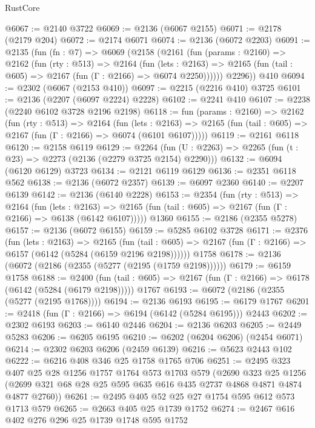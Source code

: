 \begin{lexlean}{RustCore}
\begin{coremodule}
@6067 := @2140 @3722
@6069 := @2136 (@6067 @2155)
@6071 := @2178 (@2179 @204)
@6072 := @2174 @6071
@6074 := @2136 (@6072 @2203)
@6091 := @2135
    (fun (fn : @7) =>
    @6069
      (@2158
        (@2161
          (fun (params : @2160) =>
          @2162
            (fun (rty : @513) =>
            @2164
              (fun (lets : @2163) =>
              @2165 (fun (tail : @605) => @2167 (fun (Γ : @2166) => @6074 @2250))))))
        @2296))
    @410
@6094 := @2302 (@6067 (@2153 @410))
@6097 := @2215 (@2216 @410) @3725
@6101 := @2136 (@2207 (@6097 @2224) @2228)
@6102 := @2241 @410
@6107 := @2238 (@2240 @6102 @3728 @2196 @2198)
@6118 := fun (params : @2160) =>
  @2162
    (fun (rty : @513) =>
    @2164
      (fun (lets : @2163) =>
      @2165 (fun (tail : @605) => @2167 (fun (Γ : @2166) => @6074 (@6101 @6107)))))
@6119 := @2161 @6118
@6120 := @2158 @6119
@6129 := @2264 (fun (U : @2263) => @2265 (fun (t : @23) => @2273 (@2136 (@2279 @3725 @2154) @2290)))
@6132 := @6094 (@6120 @6129) @3723
@6134 := @2121 @6119 @6129
@6136 := @2351 @6118 @562
@6138 := @2136 (@6072 @2357)
@6139 := @6097 @2360
@6140 := @2207 @6139
@6142 := @2136 (@6140 @2228)
@6153 := @2354
    (fun (rty : @513) =>
    @2164
      (fun (lets : @2163) =>
      @2165 (fun (tail : @605) => @2167 (fun (Γ : @2166) => @6138 (@6142 @6107)))))
    @1360
@6155 := @2186 (@2355 @5278)
@6157 := @2136 (@6072 @6155)
@6159 := @5285 @6102 @3728
@6171 := @2376
    (fun (lets : @2163) =>
    @2165
      (fun (tail : @605) => @2167 (fun (Γ : @2166) => @6157 (@6142 (@5284 (@6159 @2196 @2198))))))
    @1758
@6178 := @2136 (@6072 (@2186 (@2355 (@5277 (@2195 (@1759 @2198))))))
@6179 := @6159 @1758
@6188 := @2400
    (fun (tail : @605) => @2167 (fun (Γ : @2166) => @6178 (@6142 (@5284 (@6179 @2198)))))
    @1767
@6193 := @6072 (@2186 (@2355 (@5277 (@2195 @1768))))
@6194 := @2136 @6193
@6195 := @6179 @1767
@6201 := @2418 (fun (Γ : @2166) => @6194 (@6142 (@5284 @6195))) @2443
@6202 := @2302 @6193
@6203 := @6140 @2446
@6204 := @2136 @6203
@6205 := @2449 @5283
@6206 := @6205 @6195
@6210 := @6202 (@6204 @6206) (@2454 @6071)
@6214 := @2302 @6203 @6206 (@2459 @6139)
@6216 := @5623 @2443 @102
@6222 := @6216 @408 @346 @25 @1758 @1765 @706
@6251 := @2495
    @323
    @407
    @25
    @28
    @1256
    @1757
    @1764
    @573
    @1703
    @579
    (@2690
      @323
      @25
      @1256
      (@2699 @321 @68 @28 @25 @595 @635 @616 @435 @2737 @4868 @4871 @4874 @4877 @2760))
@6261 := @2495 @405 @52 @25 @27 @1754 @595 @612 @573 @1713 @579
@6265 := @2663 @405 @25 @1739 @1752
@6274 := @2467 @616 @402 @276 @296 @25 @1739 @1748 @595 @1752

\end{coremodule}
\end{lexlean}
